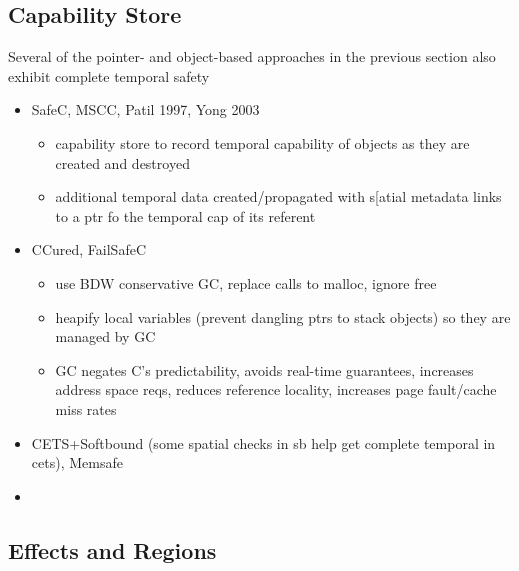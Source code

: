 \documentclass[aspectratio=169]{beamer}
\begin{document}
\subsection{Capability Store}

\begin{frame}
Several of the pointer- and object-based approaches in the previous section also exhibit complete temporal safety
    \begin{itemize}
        \item SafeC, MSCC, Patil 1997, Yong 2003
            \begin{itemize}
              \item capability store to record temporal capability of objects as they are created and destroyed
              \item additional temporal data created/propagated with s[atial metadata links to a ptr fo the temporal cap of its referent
            \end{itemize}
        \item CCured, FailSafeC
           \begin{itemize}
                \item use BDW conservative GC, replace calls to malloc, ignore free
                \item heapify local variables (prevent dangling ptrs to stack objects) so they are managed by GC
                \item GC negates C's predictability, avoids real-time guarantees, increases address space reqs, reduces reference locality, increases page fault/cache miss rates
            \end{itemize}
        \item CETS+Softbound (some spatial checks in sb help get complete temporal in cets), Memsafe
        \item {}
    \end{itemize}
\end{frame}


\subsection{Effects and Regions}
\end{document}
